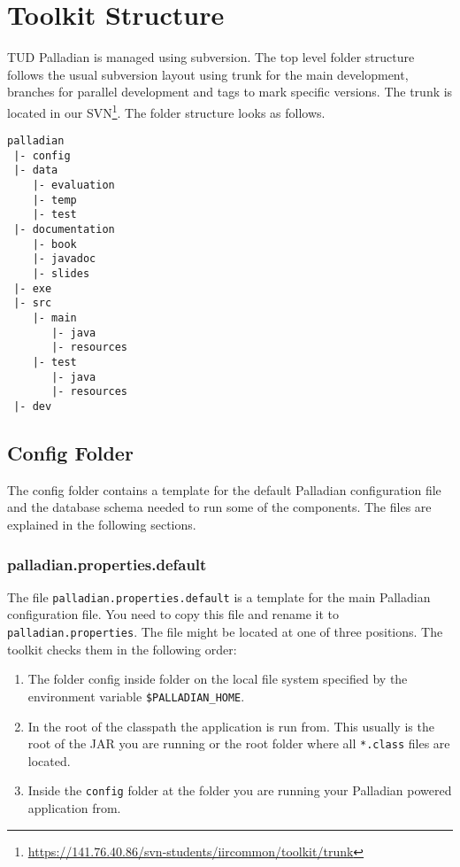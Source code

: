 \chapter{Toolkit Structure}
\label{sec:toolkitstructure}
TUD Palladian is managed using subversion. The top level folder structure follows the usual subversion layout using trunk for the main development, branches for parallel development and tags to mark specific versions. The trunk is located in our SVN\footnote{\url{https://141.76.40.86/svn-students/iircommon/toolkit/trunk}}. The folder structure looks as follows.
\begin{verbatim}
palladian
 |- config
 |- data
    |- evaluation
    |- temp
    |- test
 |- documentation
    |- book
    |- javadoc
    |- slides
 |- exe
 |- src
    |- main
       |- java
       |- resources
    |- test
       |- java
       |- resources
 |- dev
\end{verbatim}

\section{Config Folder}
\label{sec:config.conf}
The config folder contains a template for the default Palladian configuration file and the database schema needed to run some of the components. The files are explained in the following sections.

\subsection{palladian.properties.default}
\label{sec:palladian.properties.default}
The file \texttt{palladian.properties.default} is a template for the main Palladian configuration file. You need to copy this file and rename it to \texttt{palladian.properties}. The file might be located at one of three positions. The toolkit checks them in the following order:
\begin{enumerate}
\item The folder config inside folder on the local file system specified by the environment variable \texttt{\$PALLADIAN\_HOME}.
\item In the root of the classpath the application is run from. This usually is the root of the JAR you are running or the root folder where all \texttt{*.class} files are located.
\item Inside the \texttt{config} folder at the folder you are running your Palladian powered application from.
\end{enumerate}

